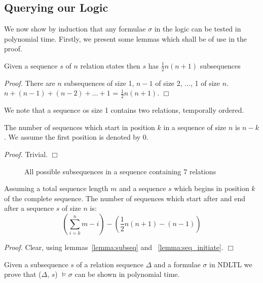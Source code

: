 \subsection{Querying our Logic}


We now show by induction that any formulae $\sigma$ in the logic can be tested
in polynomial time. Firstly, we present some lemmas which shall be of use
in the proof.


\begin{lemma}\label{lemma:subseq}
\begin{rm}
Given a sequence $s$ of $n$ relation states then $s$ has $\frac{1}{2}
n(n+1)$ subsequences
\end{rm}
\end{lemma}

{\em Proof.} There are $n$ subsequences of size 1, $n-1$ of size 2,
$\ldots$, 1 of size $n$. $n + (n-1) + (n-2) + \ldots + 1$ = $\frac{1}{2}
n(n+1)$. $\Box$

We note that a sequence os size 1 contains two relations, temporally
ordered. 
\begin{lemma}\label{lemma:seq_initiate}
\begin{rm}
The number of sequences which start in position $k$ in
a sequence of size $n$ is $n-k$. We assume the first position is
denoted by 0.
\end{rm}
\end{lemma}

{\em Proof.} Trivial. $\Box$


\begin{figure}[ht]
\centerline{}
\caption{\label{fig:sequence} All possible subsequences in a sequence
containing 7 relations}
\end{figure}


\begin{lemma}\label{lemma:seq_extend}
\begin{rm}
Assuming a total sequence length $m$ and a sequence $s$ which begins
in position $k$ of the complete sequence. The number of sequences
which start after and end after a sequence $s$ of size $n$ is:  
\[
(\sum_{i = k}^{n} m - i) - (\frac{1}{2}n(n+1) - (n-1))
\]
\end{rm}
\end{lemma}

{\em Proof.} Clear, using lemmas~\ref{lemma:subseq} and
~\ref{lemma:seq_initiate}. $\Box$ 


 
\begin{theorem}
\begin{rm}
Given a subsequence $s$ of a relation sequence $\Delta$ and a formulae $\sigma$ in NDLTL
we prove that ($\Delta$, $s$) $\models \sigma$ can be shown in
 polynomial time.
\end{rm}
\end{theorem}

